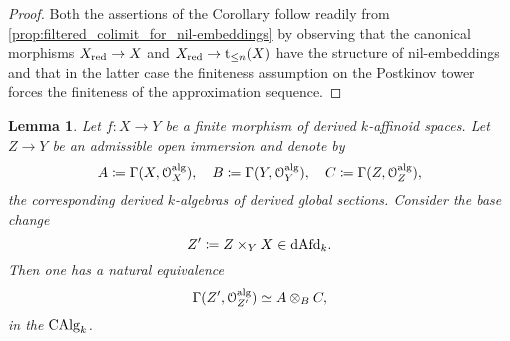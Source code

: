 \documentclass[10pt,a4paper,reqno]{amsart} %
\theoremstyle{plain}
\newtheorem{lem}[thm]{Lemma}
\theoremstyle{definition}
\theoremstyle{remark}
\numberwithin{equation}{section}
\begin{document}
\begin{proof}
    Both the assertions of the Corollary follow readily from \cref{prop:filtered_colimit_for_nil-embeddings} by observing that the
    canonical morphisms $X_{\mathrm{red}} \to X$ and $X_{\mathrm{red}} \to \mathrm t_{\le n}(X)$ have the structure of nil-embeddings and that in the latter case the finiteness assumption on the Postkinov
    tower forces the finiteness of the approximation
    sequence.
\end{proof}

\begin{lem} \label{lem:pullbacks_of_derived_affinoid_spaces_along_finite_morphisms_are_algebraic}
    Let $f \colon X \to Y$ be a finite morphism of derived $k$-affinoid spaces. Let $Z \to Y$ be an admissible open immersion and denote by
        \[
            A \coloneqq \Gamma(X, \mathcal O_X^\mathrm{alg}), \quad B \coloneqq \Gamma(Y, \mathcal O_Y^\mathrm{alg}), \quad C \coloneqq \Gamma(Z, \mathcal O_Z^\mathrm{alg}),  
        \]
    the corresponding derived $k$-algebras of derived global sections. Consider the base change
        \[
            Z' \coloneqq Z \times_Y X \in \mathrm{dAfd}_k.
        \]
    Then one has a natural equivalence
        \[
            \Gamma(Z', \mathcal O_{Z'}^\mathrm{alg}) \simeq A \otimes_B C,  
        \]
    in the \infcat $\mathrm{CAlg}_k$.
\end{lem}
\end{document}
